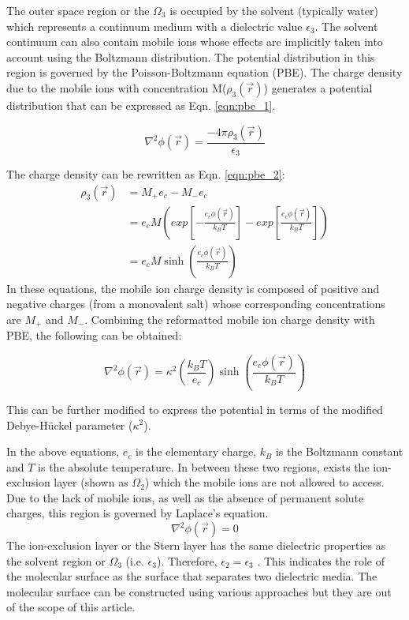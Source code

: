 \documentclass[9pt,tutorial,pubversion]{livecoms}
\begin{document}
The outer space region or the $ \Omega_3 $ is occupied by the solvent (typically water) which represents a continuum medium with a dielectric value $ \epsilon_3 $. The solvent continuum can also contain mobile ions whose effects are implicitly taken into account using the Boltzmann distribution. The potential distribution in this region is governed by the Poisson-Boltzmann equation (PBE). The charge density due to the mobile ions with concentration M($ \rho_3(\Vec{r}) $) generates a potential distribution that can be expressed as Eqn. \ref{eqn:pbe_1}.

\begin{equation}\label{eqn:pbe_1}
\nabla^2\phi(\Vec{r}) = \frac{-4\pi\rho_3(\Vec{r})}{\epsilon_3} 
\end{equation}

The charge density can be rewritten as Eqn. \ref{eqn:pbe_2}:
\begin{align}\label{eqn:pbe_2}
\rho_3(\Vec{r}) &= M_+ e_c - M_- e_c \nonumber \\
&= e_c M \left(exp\left[ - \frac{e_c\phi(\Vec{r})}{k_BT}\right] - exp\left[  \frac{e_c\phi(\Vec{r})}{k_BT}\right]\right) \nonumber \\
&= e_c M \sinh\left({\frac{e_c\phi(\Vec{r})}{k_BT}}\right)
\end{align}
In these equations, the mobile ion charge density is composed of positive and negative charges (from a monovalent salt) whose corresponding concentrations are $ M_+ $ and $ M_- $. Combining the reformatted mobile ion charge density with PBE, the following can be obtained:

\begin{equation}\label{eqn:pbe_3}
\nabla^2\phi(\Vec{r}) = \kappa^2 \left (\frac{k_BT}{e_c} \right) \sinh\left({\frac{e_c\phi(\Vec{r})}{k_BT}} \right)
\end{equation}

This can be further modified to express the potential in terms of the modified Debye-Hückel parameter ($\kappa^2$).

In the above equations, $ e_c $ is the elementary charge, $ k_B $ is the Boltzmann constant and $ T $ is the absolute temperature.
In between these two regions,  exists the ion-exclusion layer (shown as $ \Omega_2 $) which the mobile ions are not allowed to access. Due to the lack of mobile ions, as well as the absence of permanent solute charges, this region is governed by Laplace’s equation.
\begin{equation}
\nabla^2\phi(\Vec{r}) = 0
\end{equation}
The ion-exclusion layer or the Stern layer has the same dielectric properties as the solvent region or $ \Omega_3 $ (i.e. $ \epsilon_3 $). Therefore, $ \epsilon_2=\epsilon_3 $ . This indicates the role of the molecular surface as the surface that separates two dielectric media. The molecular surface can be constructed using various approaches but they are out of the scope of this article\cite{rocchia2002rapid,chakravorty2019grid,decherchi2013between}. 
\end{document}
